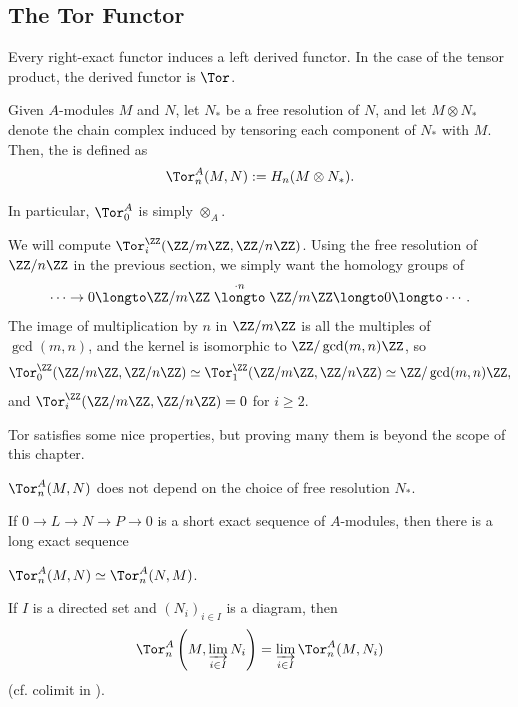 \subsection{The Tor Functor}
Every right-exact functor induces a left derived functor. In the case of the tensor product, the derived functor is $\Tor$.
\begin{definition}
    \label{def:tor}
    Given $A$-modules $M$ and $N$, let $N_*$ be a free resolution of $N$, and let $M\otimes N_*$ denote the chain complex induced by tensoring each component of $N_*$ with $M$. Then, the  is defined as \[\Tor_n^A(M,N) := H_n(M\otimes N_*).\]
\end{definition}
In particular, $\Tor_0^A$ is simply $\otimes_A$.
\begin{example}
    We will compute $\Tor_i^\ZZ(\ZZ/m\ZZ, \ZZ/n\ZZ)$. Using the free resolution of $\ZZ/n\ZZ$ in the previous section, we simply want the homology groups of \[\cdots\to 0\longto \ZZ/m\ZZ\stackrel{\cdot n}\longto \ZZ/m\ZZ \longto 0\longto\cdots.\] The image of multiplication by $n$ in $\ZZ/m\ZZ$ is all the multiples of $\gcd(m,n)$, and the kernel is isomorphic to $\ZZ/\gcd(m,n)\ZZ$, so \[\Tor_0^\ZZ(\ZZ/m\ZZ,\ZZ/n\ZZ) \simeq \Tor_1^\ZZ(\ZZ/m\ZZ,\ZZ/n\ZZ) \simeq \ZZ/\gcd(m,n)\ZZ,\] and $\Tor_i^\ZZ(\ZZ/m\ZZ,\ZZ/n\ZZ)=0$ for $i\ge 2$.
\end{example}
Tor satisfies some nice properties, but proving many them is beyond the scope of this chapter.
\begin{theorem}
\label{thm:tor_properties}
\begin{alphenum}
    \item $\Tor_n^A(M,N)$ does not depend on the choice of free resolution $N_*$.
    \item If $0\to L\to N\to P\to 0$ is a short exact sequence of $A$-modules, then there is a long exact sequence 
    \begin{center}
    \end{center}
    \item $\Tor_n^A(M,N) \simeq \Tor_n^A(N,M)$.
    \item If $I$ is a directed set and $(N_i)_{i\in I}$
    is a diagram, then
    $$\Tor_n^A\left(M, \varinjlim_{i\in I} N_i\right)
    = \varinjlim_{i\in I} \Tor_n^A(M, N_i)$$
    (cf. colimit in ).
\end{alphenum}
\end{theorem}
